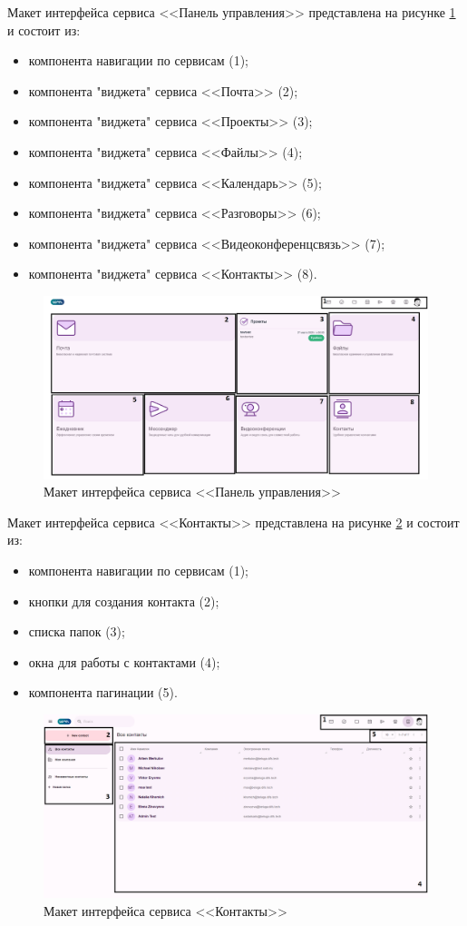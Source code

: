 Макет интерфейса сервиса <<Панель управления>> представлена на рисунке \ref{templ:image4} и состоит из:
\begin{itemize}
  \item компонента навигации по сервисам (1);
  \item компонента "виджета" сервиса <<Почта>> (2);
  \item компонента "виджета" сервиса <<Проекты>> (3);
  \item компонента "виджета" сервиса <<Файлы>> (4);
  \item компонента "виджета" сервиса <<Календарь>> (5);
  \item компонента "виджета" сервиса <<Разговоры>> (6);
  \item компонента "виджета" сервиса <<Видеоконференцсвязь>> (7);
  \item компонента "виджета" сервиса <<Контакты>> (8).
\end{itemize}
\begin{figure}[H]
	\centering
	\includegraphics[width=1\linewidth]{images/дашборд}
	\caption{Макет интерфейса сервиса <<Панель управления>>}
	\label{templ:image4}
\end{figure}

Макет интерфейса сервиса <<Контакты>> представлена на рисунке \ref{templ:image5} и состоит из:
\begin{itemize}
  \item компонента навигации по сервисам (1);
  \item кнопки для создания контакта (2);
  \item списка папок (3);
  \item окна для работы с контактами (4);
  \item компонента пагинации (5).
\end{itemize}
\begin{figure}[H]
	\centering
	\includegraphics[width=1\linewidth]{images/контакты}
	\caption{Макет интерфейса сервиса <<Контакты>>}
	\label{templ:image5}
\end{figure}

